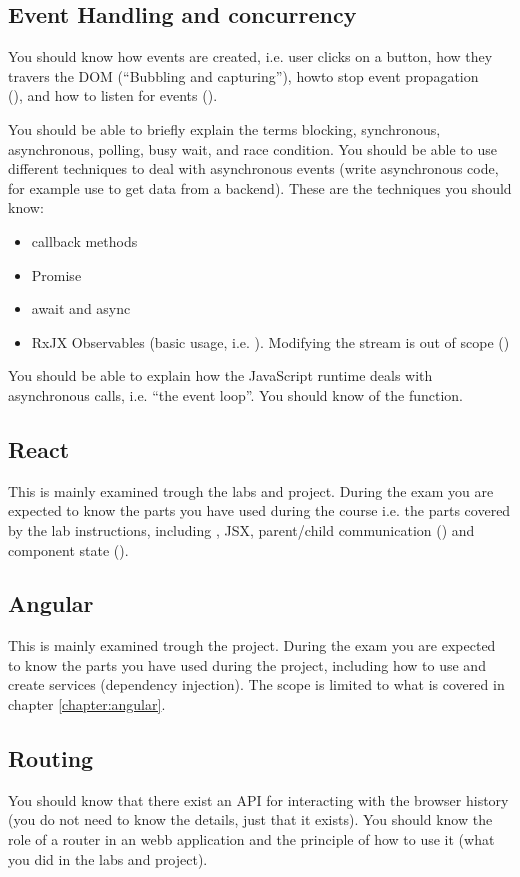 \subsection*{Event Handling and concurrency}
You should know how events are created, i.e. user clicks on a button, how they travers the DOM (``Bubbling and capturing''), howto stop event propagation \\(), and how to listen for events ().

You should be able to briefly explain the terms blocking, synchronous, asynchronous, polling, busy wait, and race condition. You should be able to use different techniques to deal with asynchronous events (write asynchronous code, for example use  to get data from a backend). These are the techniques you should know:
\begin{itemize}
\item callback methods
\item Promise
\item await and async
\item RxJX Observables (basic usage, i.e. ). Modifying the stream is out of scope ()
\end{itemize}
You should be able to explain how the JavaScript runtime deals with asynchronous calls, i.e. ``the event loop''. You should know of the  function.

\subsection*{React}
This is mainly examined trough the labs and project. During the exam you are expected to know the parts you have used during the course i.e. the parts covered by the lab instructions, including , JSX, parent/child communication () and component state ().

\subsection*{Angular}
This is mainly examined trough the project. During the exam you are expected to know the parts you have used during the project, including how to use and create services (dependency injection). The scope is limited to what is covered in chapter \ref{chapter:angular}.

\subsection*{Routing}
You should know that there exist an API for interacting with the browser history (you do not need to know the details, just that it exists). You should know the role of a router in an webb application and the principle of how to use it (what you did in the labs and project).

